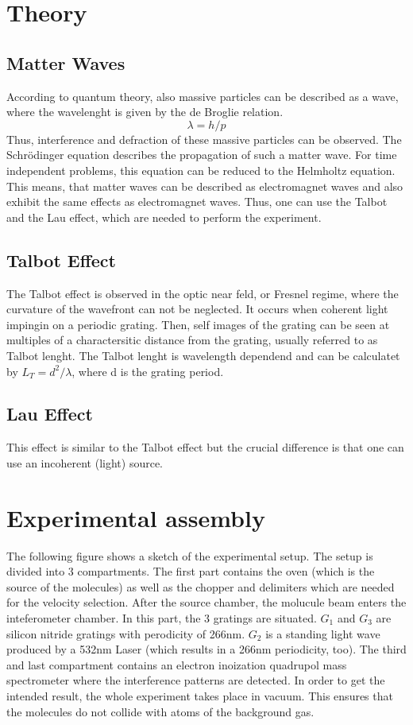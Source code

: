 \documentclass[12pt,a4paper]{article}
\begin{document}
\begin{multicols}{2}
\section{Theory}
\subsection{Matter Waves}
According to quantum theory, also massive particles can be described as a wave, where the wavelenght is given by the de Broglie relation.
$$\lambda=h/p$$
Thus, interference and defraction of these massive particles can be observed. The Schrödinger equation describes the propagation of such a matter wave. For time independent problems, this equation can be reduced to the Helmholtz equation. This means, that matter waves can be described as electromagnet waves and also exhibit the same effects as electromagnet waves. Thus, one can use the Talbot and the Lau effect, which are needed to perform the experiment.
\subsection{Talbot Effect}
The Talbot effect is observed in the optic near feld, or Fresnel regime, where the curvature of the wavefront can not be neglected. It occurs when coherent light impingin on a periodic grating. Then,  self images of the grating can be seen at multiples of a charactersitic distance from the grating, usually referred to as Talbot lenght. The Talbot lenght is wavelength dependend and can be calculatet by $L_T=d^2/\lambda$, where d is the grating period.

\subsection{Lau Effect}
This effect is similar to the Talbot effect but the crucial difference is that one can use an incoherent (light) source. 
\section{Experimental assembly}
The following figure shows a sketch of the experimental setup. The setup is divided into 3 compartments. The first part contains the oven (which is the source of the molecules) as well as the chopper and delimiters which are needed for the velocity selection. 
After the source chamber, the molucule beam enters the inteferometer chamber. In this part, the 3 gratings are situated. $G_1$ and $G_3$ are silicon nitride gratings with perodicity of 266nm. $G_2$ is a standing light wave produced by a 532nm Laser (which results in a 266nm periodicity, too).
The third and last compartment contains an electron inoization quadrupol mass spectrometer where the interference patterns are detected.
In order to get the intended result, the whole experiment takes place in vacuum. This ensures that the molecules do not collide with atoms of the background gas.


\end{multicols}
\end{document}
